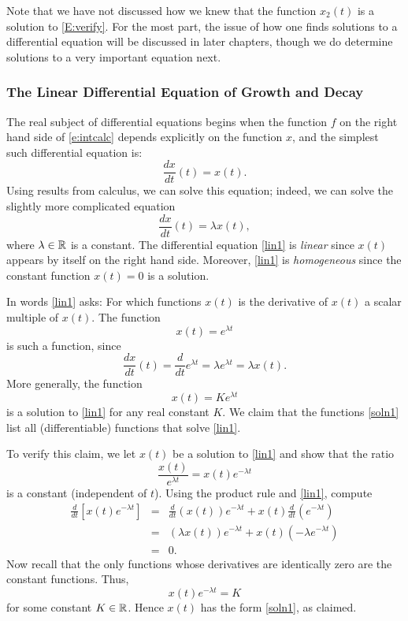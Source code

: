 \documentclass{ximera}
\begin{document}
Note that we have not discussed how we knew that the function $x_2(t)$
is a solution to \eqref{E:verify}.  For the most part, the issue of how
one finds solutions to a differential equation will be discussed in later
chapters, though we do determine solutions to a very important equation next.

\subsubsection*{The Linear Differential Equation of Growth and Decay}

The real subject of differential equations begins when the function $f$
on the right hand side of \eqref{e:intcalc} depends explicitly on the
function $x$, and the simplest such differential equation is:
\[
\frac{dx}{dt}(t) = x(t).
\]
Using results from calculus, we can solve this equation; indeed,
we can solve the slightly more complicated equation
\begin{equation}  \label{lin1}
\frac{dx}{dt}(t) = \lambda x(t),
\end{equation}
where $\lambda\in\mbox{$\Bbb{R}$}$ is a constant.  The differential equation \eqref{lin1} is 
{\em linear\/} since $x(t)$ appears by itself on the right hand side.  
Moreover, \eqref{lin1} is {\em homogeneous\/} since the constant function 
$x(t)=0$ is a solution.


In words \eqref{lin1} asks: For which functions $x(t)$ is the
derivative of $x(t)$ a scalar multiple of $x(t)$.  The function
\[
x(t)=e^{\lambda t}
\]
is such a function, since
\[
\frac{dx}{dt}(t) = \frac{d}{dt}e^{\lambda t} =
\lambda e^{\lambda t} = \lambda x(t).
\]
More generally, the function
\begin{equation} \label{soln1}
x(t) = K e^{\lambda t}
\end{equation}
is a solution to \eqref{lin1} for any real constant $K$.  We claim
that the functions \eqref{soln1} list all (differentiable)
functions that solve \eqref{lin1}.

To verify this claim, we let $x(t)$ be a solution to \eqref{lin1}
and show that the ratio 
\[
\frac{x(t)}{e^{\lambda t}} = x(t)e^{-\lambda t}
\]
is a constant (independent of $t$).  Using the product rule 
 and \eqref{lin1}, compute
\begin{eqnarray*}
\frac{d}{dt}\left[x(t)e^{-\lambda t}\right] & = &
\frac{d}{dt}\left(x(t)\right) e^{-\lambda t} +
x(t)\frac{d}{dt}\left(e^{-\lambda t}\right) \\
& = &
(\lambda x(t)) e^{-\lambda t} + x(t)(-\lambda e^{-\lambda t}) \\
& = & 0.
\end{eqnarray*}
Now recall that the only functions whose derivatives are
identically zero are the constant functions.  Thus,
\[
x(t) e^{-\lambda t} = K
\]
for some constant $K\in\mbox{$\Bbb{R}$}$.  Hence $x(t)$ has the form
\eqref{soln1}, as claimed.
\end{document}
